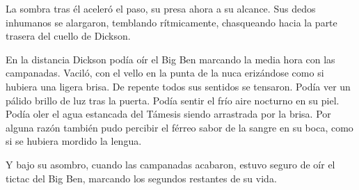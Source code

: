{La sombra tras él aceleró el paso, su presa ahora a su alcance. Sus
	dedos inhumanos se alargaron, temblando rítmicamente, chasqueando hacia
la parte trasera del cuello de Dickson.}

{En la distancia Dickson podía oír el Big Ben marcando la media hora con
	las campanadas. Vaciló, con el vello en la punta de la nuca erizándose
	como si hubiera una ligera brisa. De repente todos sus sentidos se
	tensaron. Podía ver un pálido brillo de luz tras la puerta. Podía sentir
	el frío aire nocturno en su piel. Podía oler el agua estancada del
	Támesis siendo arrastrada por la brisa. Por alguna razón también pudo
	percibir el férreo sabor de la sangre en su boca, como si se hubiera
mordido la lengua.}

{Y bajo su asombro, cuando las campanadas acabaron, estuvo seguro de oír
el tictac del Big Ben, marcando los segundos restantes de su vida.}
